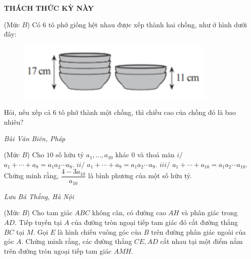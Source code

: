 \begin{center}
	\vspace*{-5pt}
	\textbf{\color{thachthuctoanhoc}\color{thachthuctoanhoc}\color{thachthuctoanhoc}\color{thachthuctoanhoc}THÁCH THỨC KỲ NÀY}
	\vspace*{-5pt}
\end{center}
\begin{multicols}{2}
	\setlength{\abovedisplayskip}{4pt}
	\setlength{\belowdisplayskip}{4pt}
	{}
	(Mức $B$) Có $6$ tô phở giống hệt nhau được xếp thành hai chồng, như ở hình dưới đây: 
	\begin{figure}[H]
		\vspace*{-5pt}
		\centering
		\captionsetup{labelformat= empty, justification=centering}
		\includegraphics[width= 1\linewidth]{1}
		\vspace*{-10pt}
	\end{figure}
	Hỏi, nếu xếp cả $6$ tô phở thành một chồng, thì chiều cao của chồng đó là bao nhiêu?
	\begin{flushright}
		\textit{Bùi Văn Biên, Pháp}
	\end{flushright}
	{}
	(Mức $B$) Cho $10$ số hữu tỷ $a_1,\ldots,a_{10}$ khác $0$ và thoả mãn
	\vskip 0.05cm
	$i/$ $a_1+\cdots+a_8=a_1a_2\cdots a_8$. 
	\vskip 0.05cm
	$ii/$ $a_1+\cdots+a_9=a_1a_2\cdots a_9$. 
	\vskip 0.05cm
	$iii/$ $a_1+\cdots+a_{10}=a_1a_2\cdots a_{10}$. 
	\vskip 0.05cm
	Chứng minh rằng, $\dfrac{4-3a_{10}}{a_{10}}$ là bình phương của một số hữu tỷ.
	\begin{flushright}
		\textit{Lưu Bá Thắng, Hà Nội}
	\end{flushright}
	{}
	(Mức $B$) Cho tam giác $A B C$ không cân, có đường cao $A H$ và phân giác trong $A D$. Tiếp tuyến tại $A$ của đường tròn ngoại tiếp tam giác đó cắt đường thẳng $B C$ tại $M$. Gọi $E$ là hình chiếu vuông góc của $B$ trên đường phân giác ngoài của góc $A$. Chứng minh rằng, các đường thẳng $C E, A D$ cắt nhau tại một điểm nằm trên đường tròn ngoại tiếp tam giác $A M H.$

\end{multicols}
